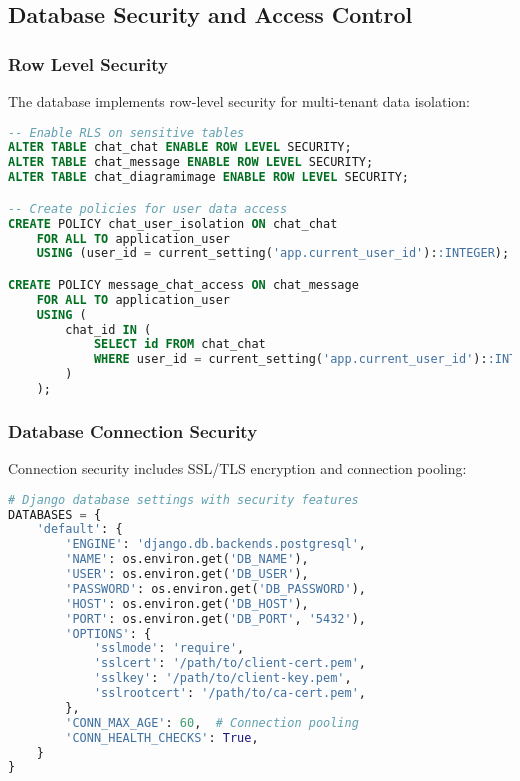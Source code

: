 \documentclass[12pt,a4paper]{article}
\begin{document}
\subsection{Database Security and Access Control}

\subsubsection{Row Level Security}

The database implements row-level security for multi-tenant data isolation:

\begin{lstlisting}[language=SQL, caption=Row Level Security Implementation]
-- Enable RLS on sensitive tables
ALTER TABLE chat_chat ENABLE ROW LEVEL SECURITY;
ALTER TABLE chat_message ENABLE ROW LEVEL SECURITY;
ALTER TABLE chat_diagramimage ENABLE ROW LEVEL SECURITY;

-- Create policies for user data access
CREATE POLICY chat_user_isolation ON chat_chat
    FOR ALL TO application_user
    USING (user_id = current_setting('app.current_user_id')::INTEGER);

CREATE POLICY message_chat_access ON chat_message
    FOR ALL TO application_user
    USING (
        chat_id IN (
            SELECT id FROM chat_chat 
            WHERE user_id = current_setting('app.current_user_id')::INTEGER
        )
    );
\end{lstlisting}

\subsubsection{Database Connection Security}

Connection security includes SSL/TLS encryption and connection pooling:

\begin{lstlisting}[language=Python, caption=Secure Database Configuration]
# Django database settings with security features
DATABASES = {
    'default': {
        'ENGINE': 'django.db.backends.postgresql',
        'NAME': os.environ.get('DB_NAME'),
        'USER': os.environ.get('DB_USER'),
        'PASSWORD': os.environ.get('DB_PASSWORD'),
        'HOST': os.environ.get('DB_HOST'),
        'PORT': os.environ.get('DB_PORT', '5432'),
        'OPTIONS': {
            'sslmode': 'require',
            'sslcert': '/path/to/client-cert.pem',
            'sslkey': '/path/to/client-key.pem',
            'sslrootcert': '/path/to/ca-cert.pem',
        },
        'CONN_MAX_AGE': 60,  # Connection pooling
        'CONN_HEALTH_CHECKS': True,
    }
}
\end{lstlisting}
\end{document}

